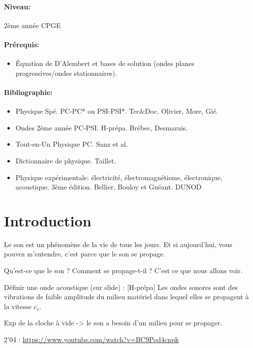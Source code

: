 \documentclass[11pt]{report}
\numberwithin{figure}{section}
\numberwithin{equation}{section}
\numberwithin{table}{section}
\newcommand{\1}{\boldsymbol{1}}
\begin{document}
\paragraph*{Niveau:} 2ème année CPGE
\paragraph*{Prérequis:} 
\begin{itemize}
\item Équation de D'Alembert et bases de solution (ondes planes progressives/ondes stationnaires).
\end{itemize}

\paragraph*{Bibliographie:}
\begin{itemize}
\item Physique Spé. PC-PC* ou PSI-PSI*. Tec\&Doc. Olivier, More, Gié.
\item Ondes 2ème année PC-PSI. H-prépa. Brébec, Desmarais.
\item Tout-en-Un Physique PC. Sanz et al.
\item Dictionnaire de physique. Taillet. 
\item Physique expérimentale: électricité, électromagnétisme, électronique, acoustique. 3ème édition. Bellier, Bouloy et Guéant. DUNOD
\end{itemize}



\section*{Introduction}
  
Le son est un phénomène de la vie de tous les jours. Et si aujourd'hui, vous pouvez m'entendre, c'est parce que le son se propage. 

Qu'est-ce que le son ? Comment se propage-t-il ? C'est ce que nous allons voir.


Définir une onde acoustique (sur slide) : [H-prépa] Les ondes sonores sont des vibrations de faible amplitude du milieu matériel dans lequel elles se propagent à la vitesse $c_s$.


Exp de la cloche à vide -> le son a besoin d'un milieu pour se propager.

2'04 : \url{https://www.youtube.com/watch?v=BC9Pod4cnpk}  \\
\end{document}
